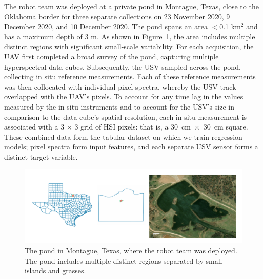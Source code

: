 \documentclass[remotesensing,article,accept,pdftex,moreauthors]{Definitions/mdpi}
\begin{document}
The robot team was deployed at a private pond in Montague, Texas, close to the Oklahoma border for three separate collections on 23 November 2020, 9 December 2020, and 10 December 2020. The pond spans an area $<$0.1 km$^{2}$ and has a maximum depth of 3 m. As shown in Figure~\ref{fig:study-area}, the area includes multiple distinct regions with significant small-scale variability. For each acquisition, the UAV first completed a broad survey of the pond, capturing multiple hyperspectral data cubes. Subsequently, the USV sampled across the pond, collecting in situ reference measurements. Each of these reference measurements was then collocated with individual pixel spectra, whereby the USV track overlapped with the UAV's pixels. To account for any time lag in the values measured by the in situ instruments and to account for the USV's size in comparison to the data cube's spatial resolution, each in situ measurement is associated with a 3 $\times$ 3 grid of HSI pixels: that is, a \mbox{30 cm $\times$ 30 cm} square. These combined data form the tabular dataset on which we train regression models; pixel spectra form input features, and each separate USV sensor forms a distinct target variable.

\begin{figure}[H]
\centering
\vspace{-0.1in}
\hspace{-9pt}\includegraphics[width=\columnwidth]{figures/materials-and-methods/study-area.pdf}
\vspace{-0.1in}
\caption{The pond in Montague, Texas, where the robot team was deployed. The pond includes multiple distinct regions separated by small islands and grasses. \label{fig:study-area}}
\end{figure}  
\end{document}
